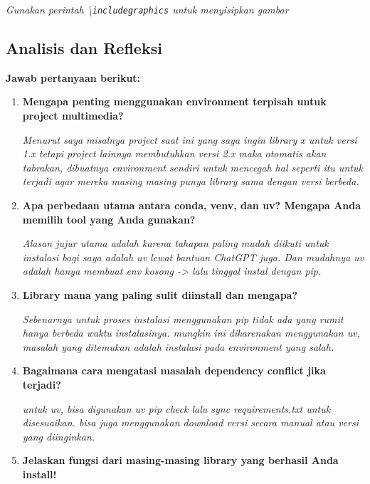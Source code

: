 \documentclass[11pt,a4paper]{article}
\begin{document}
\textit{Gunakan perintah \textbackslash\texttt{includegraphics} untuk menyisipkan gambar}

\subsection{Analisis dan Refleksi}
\textbf{Jawab pertanyaan berikut:}

\begin{enumerate}
    \item \textbf{Mengapa penting menggunakan environment terpisah untuk project multimedia?}
    
    \textit{Menurut saya misalnya project saat ini yang saya ingin library x untuk versi 1.x tetapi project lainnya membutuhkan versi 2.x maka otomatis akan tabrakan, dibuatnya environment sendiri untuk mencegah hal seperti itu untuk terjadi agar mereka masing masing punya library sama dengan versi berbeda.}
    
    \item \textbf{Apa perbedaan utama antara conda, venv, dan uv? Mengapa Anda memilih tool yang Anda gunakan?}
    
    \textit{Alasan jujur utama adalah karena tahapan paling mudah diikuti untuk instalasi bagi saya adalah uv lewat bantuan ChatGPT juga. Dan mudahnya uv adalah hanya membuat env kosong -> lalu tinggal instal dengan pip.}
    
    \item \textbf{Library mana yang paling sulit diinstall dan mengapa?}
    
    \textit{Sebenarnya untuk proses instalasi menggunakan pip tidak ada yang rumit hanya berbeda waktu instalasinya. mungkin ini dikarenakan menggunakan uv, masalah yang ditemukan adalah instalasi pada environment yang salah.}
    
    \item \textbf{Bagaimana cara mengatasi masalah dependency conflict jika terjadi?}
    
    \textit{untuk uv, bisa digunakan uv pip check lalu sync requirements.txt untuk disesuaikan. bisa juga menggunakan download versi secara manual atau versi yang diinginkan.}
    
    \item \textbf{Jelaskan fungsi dari masing-masing library yang berhasil Anda install!}
    

\end{enumerate}
\end{document}
